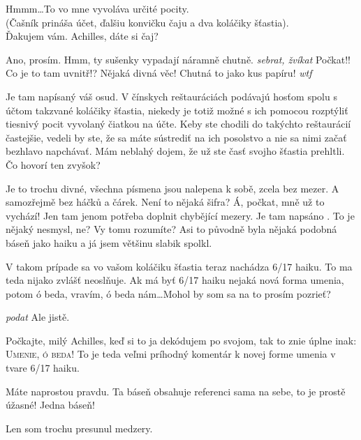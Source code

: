 \documentclass[12pt]{article}
\begin{document}
\begin{description}[itemsep=0pt]
\item[Ž:] Hmmm\dots To vo mne vyvoláva určité pocity.\\
    (Čašník prináša účet, ďalšiu konvičku čaju a dva koláčiky šťastia).\\
    Ďakujem vám. Achilles, dáte si čaj?

\item[A:] Ano, prosím. Hmm, ty sušenky vypadají náramně chutně. \textit{sebrat, žvíkat}
    Počkat!! Co je to tam uvnitř!? Nějaká divná věc! Chutná to jako kus papíru! \textit{wtf}

\item[Ž:] Je tam napísaný váš osud. V čínskych reštauráciách podávajú hosťom spolu s účtom 
    takzvané koláčiky šťastia, niekedy je totiž možné s ich pomocou rozptýliť tiesnivý
    pocit vyvolaný čiatkou na účte. Keby ste chodili do takýchto reštaurácií častejšie, 
    vedeli by ste, že sa máte sústrediť na ich posolstvo a nie sa nimi začať bezhlavo 
    napchávať. Mám neblahý dojem, že už ste časť svojho šťastia prehltli. Čo hovorí ten zvyšok?

\item[A:] Je to trochu divné, všechna písmena jsou nalepena k sobě, zcela bez mezer.
    A samozřejmě bez háčků a čárek. Není to nějaká šifra? Á, počkat, mně už to vychází!
    Jen tam jenom potřeba doplnit chybějící mezery. Je tam napsáno .
    To je nějaký nesmysl, ne? Vy tomu rozumíte? Asi to původně byla nějaká podobná báseň
    jako haiku a já jsem většinu slabik spolkl.

\item[Ž:] V takom prípade sa vo vašom koláčiku šťastia teraz nachádza 6/17 haiku. To ma 
    teda nijako zvlášť neoslňuje. Ak má byť 6/17 haiku nejaká nová forma umenia, potom 
    ó beda, vravím, ó beda nám\dots Mohol by som sa na to prosím pozrieť?

\item[A:] \textit{podat} Ale jistě.

\item[Ž:] Počkajte, milý Achilles, keď si to ja dekódujem po svojom, tak to znie úplne 
    inak: \textsc{Umenie, ó beda!} To je teda veľmi príhodný komentár k novej forme 
    umenia v tvare 6/17 haiku.

\item[A:] Máte naprostou pravdu. Ta báseň obsahuje referenci sama na sebe, to je prostě
    úžasné! Jedna báseň!

\item[Ž:] Len som trochu presunul medzery.


\end{description}
\end{document}
